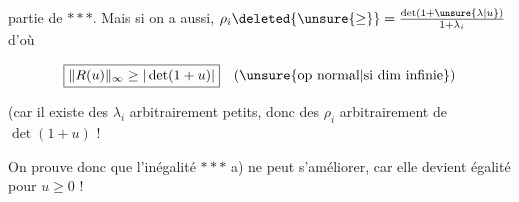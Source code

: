 partie de $***$. Mais si  on a aussi,   $\rho_i\deleted{\unsure{\geq}}=\frac{\det(1+\unsure{\lambda|u})}{1+\lambda_i}$ \deleted{\unsure{$\geq$|$\leq$}} d'où

\[
\boxed{\|R(u)\|_\infty\geq|\det(1+u)|}\quad\text{(\unsure{op normal|si dim infinie})}
\]

(car il existe des $\lambda_i$ arbitrairement petits, donc des $\rho_i$ arbitrairement  de $\det(1+u)$ !

On  prouve donc que l'inégalité $***$ a) ne peut s'améliorer, car elle devient égalité pour $u\geq0$ !
